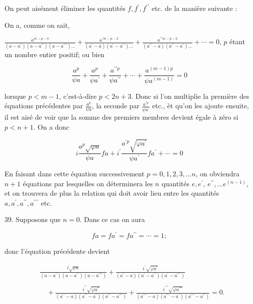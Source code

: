 \documentclass{article}
\begin{document}
On peut aisément éliminer les quantités \(f, f^{\prime}, f^{\prime \prime}\) etc. de la manière suivante :

On a, comme on sait,

\(\frac{a^{m-p-8}}{\left(a-a^{\prime}\right)\left(a-a^{\prime \prime}\right)\left(a-a^{\prime \prime \prime}\right) \ldots}+\frac{a^{\prime m-p-2}}{\left(a^{\prime}-a\right)\left(a^{\prime}-a^{\prime \prime}\right) \ldots}+\frac{a^{\prime \prime m-p-2}}{\left(a^{\prime \prime}-a\right)\left(a^{\prime \prime}-a^{\prime}\right) \ldots}+\cdots=0\), \(p\) étant un nombre entier positif; ou bien

\[
\frac{a^{p}}{\psi a}+\frac{a^{p}}{\psi a^{\prime}}+\frac{a^{\prime \prime p}}{\psi a^{\prime \prime}}+\cdots+\frac{a^{(m-1) p}}{\psi a^{(m-1)}}=0
\]

lorsque \(p<m-1\), c'est-à-dire \(p<2 n+3\). Donc si l'on multiplie la première des équations précédentes par \(\frac{a^{p}}{\psi a}\), la seconde par \(\frac{a^{\prime p}}{\psi a^{\prime}}\) etc., èt qu'on les ajoute ensuite, il est aisé de voir que la somme des premiers membres devient égale à zéro si \(p<n+1\). On a donc

\[
i \frac{a^{p} \sqrt{\varphi a}}{\psi a} f a+i^{\prime} \frac{a^{\prime p} \sqrt{\varphi a^{\prime}}}{\psi a^{\prime}} f a^{\prime}+\cdots=0
\]

En faisant dans cette équation successivement \(p=0,1,2,3, \ldots n\), on obviendra \(n+1\) équations par lesquelles on déterminera les \(n\) quantités \(e, e^{\prime}\), \(e^{\prime \prime}, \ldots e^{(n-1)}\), et on trouvera de plus la relation qui doit avoir lieu entre les quantités \(a, a^{\prime}, a^{\prime \prime}, a^{\prime \prime \prime}\) etc.

39. Supposons que \(n=0\). Dans ce cas on aura

\[
f a=f a^{\prime}=f a^{\prime \prime}=\cdots=1 ;
\]

donc l'équation précédente devient

\[
\begin{aligned}
& \frac{i \sqrt{\varphi a}}{\left(a-a^{\prime}\right)\left(a-a^{\prime \prime}\right)\left(a-a^{\prime \prime \prime}\right)}+\frac{i^{\prime} \sqrt{\varphi a^{\prime}}}{\left(a^{\prime}-a\right)\left(a^{\prime}-a^{\prime \prime}\right)\left(a^{\prime}-a^{\prime \prime \prime}\right)} \\
& \\
& \quad+\frac{i^{\prime \prime} \sqrt{\varphi a^{\prime \prime}}}{\left(a^{\prime \prime}-a\right)\left(a^{\prime \prime}-a^{\prime}\right)\left(a^{\prime \prime}-a^{\prime \prime \prime}\right)}+\frac{i^{\prime \prime \prime} \sqrt{\varphi a^{\prime \prime \prime}}}{\left(a^{\prime \prime \prime}-a\right)\left(a^{\prime \prime \prime}-a^{\prime}\right)\left(a^{\prime \prime \prime}-a^{\prime \prime}\right)}=0 .
\end{aligned}
\]
\end{document}
